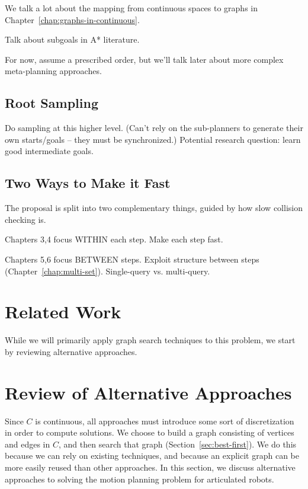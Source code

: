 \documentclass{report}
\begin{document}
We talk a lot about the mapping
from continuous spaces to graphs in
Chapter~\ref{chap:graphs-in-continuous}.

Talk about subgoals in A* literature.

For now, assume a prescribed order,
but we'll talk later about more complex meta-planning
approaches.

\subsection{Root Sampling}

Do sampling at this higher level.
(Can't rely on the sub-planners to generate their own starts/goals --
they must be synchronized.)
Potential research question: learn good intermediate goals.

\subsection{Two Ways to Make it Fast}

The proposal is split into two complementary things,
guided by how slow collision checking is.

Chapters 3,4 focus WITHIN each step.
Make each step fast.

Chapters 5,6 focus BETWEEN steps.
Exploit structure between steps (Chapter~\ref{chap:multi-set}).
Single-query vs. multi-query.

\section{Related Work}

While we will primarily apply graph search techniques to this problem,
we start by reviewing alternative approaches.

\section{Review of Alternative Approaches}
\label{sec:related-work}

Since $C$ is continuous,
all approaches must introduce some sort of discretization
in order to compute solutions.
We choose to build a graph consisting of vertices and edges in $C$,
and then search that graph (Section~\ref{sec:best-first}).
We do this because we can rely on existing techniques,
and because an explicit graph can be more easily reused than other
approaches.
In this section, we discuss alternative approaches to solving
the motion planning problem for articulated robots.
\end{document}
